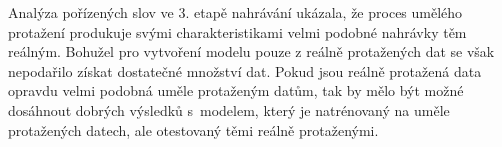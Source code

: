 

Analýza pořízených slov ve 3. etapě nahrávání ukázala, že proces umělého protažení produkuje svými charakteristikami velmi podobné nahrávky těm reálným.
Bohužel pro vytvoření modelu pouze z reálně protažených dat se však nepodařilo získat dostatečné množství dat.
Pokud jsou reálně protažená data opravdu velmi podobná uměle protaženým datům, tak by mělo být možné dosáhnout dobrých výsledků s~modelem, který je natrénovaný na uměle protažených datech, ale otestovaný těmi reálně protaženými.


